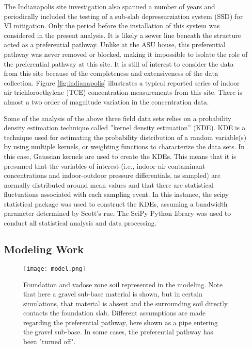 \documentclass[journal=esthag,manuscript=article]{achemso}
\begin{document}
The Indianapolis site investigation also spanned a number of years and periodically included the testing of a sub-slab depressurziation system (SSD) for VI mitigation.
Only the period before the installation of this system was considered in the present analysis.
It is likely a sewer line beneath the structure acted as a preferential pathway\cite{mchugh_evidence_2017}.
Unlike at the ASU house, this preferential pathway was never removed or blocked, making it impossible to isolate the role of the preferential pathway at this site.
It is still of interest to consider the data from this site because of the completeness and extensiveness of the data collection.
Figure \ref{fig:indianapolis} illustrates a typical reported series of indoor air trichloroethylene (TCE) concentration measurements from this site.
There is almost a two order of magnitude variation in the concentration data.

Some of the analysis of the above three field data sets relies on a probability density estimation technique called ”kernel density estimation” (KDE).
KDE is a technique used for estimating the probability distribution of a random variable(s) by using multiple kernels, or weighting functions to characterize the data sets.
In this case, Gaussian kernels are used to create the KDEs.
This means that it is presumed that the variables of interest (i.e., indoor air contaminant concentrations and indoor-outdoor pressure differentials, as sampled) are normally distributed around mean values and that there are statistical fluctuations associated with each sampling event.
In this instance, the scipy statistical package was used to construct the KDEs, assuming a bandwidth parameter determined by Scott’s rue.
The SciPy Python library was used to conduct all statistical analysis and data processing\cite{jones_scipy_2011}.

\subsection{Modeling Work}

\begin{figure}[htb!]
 \caption{Foundation and vadose zone soil represented in the modeling. Note that here a gravel sub-base material is shown, but in certain simulations, that material is absent and the surrounding soil directly contacts the foundation slab.  Different assumptions are made regarding the preferential pathway, here shown as a pipe entering the gravel sub-base. In some cases, the preferential pathway has been "turned off".}\label{fig:model}
 \texttt{[image: model.png]}
\end{figure}
\end{document}
